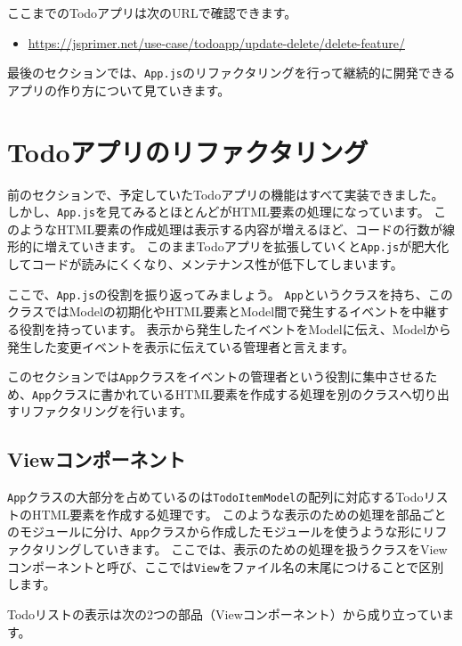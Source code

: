 ここまでのTodoアプリは次のURLで確認できます。

\begin{itemize}
\item
  \url{https://jsprimer.net/use-case/todoapp/update-delete/delete-feature/}
\end{itemize}

最後のセクションでは、\texttt{App.js}のリファクタリングを行って継続的に開発できるアプリの作り方について見ていきます。

\hypertarget{todo-app-refactoring}{%
\section{Todoアプリのリファクタリング}\label{todo-app-refactoring}}

前のセクションで、予定していたTodoアプリの機能はすべて実装できました。
しかし、\texttt{App.js}を見てみるとほとんどがHTML要素の処理になっています。
このようなHTML要素の作成処理は表示する内容が増えるほど、コードの行数が線形的に増えていきます。
このままTodoアプリを拡張していくと\texttt{App.js}が肥大化してコードが読みにくくなり、メンテナンス性が低下してしまいます。

ここで、\texttt{App.js}の役割を振り返ってみましょう。
\texttt{App}というクラスを持ち、このクラスではModelの初期化やHTML要素とModel間で発生するイベントを中継する役割を持っています。
表示から発生したイベントをModelに伝え、Modelから発生した変更イベントを表示に伝えている管理者と言えます。

このセクションでは\texttt{App}クラスをイベントの管理者という役割に集中させるため、\texttt{App}クラスに書かれているHTML要素を作成する処理を別のクラスへ切り出すリファクタリングを行います。

\hypertarget{component}{%
\subsection{Viewコンポーネント}\label{component}}

\texttt{App}クラスの大部分を占めているのは\texttt{TodoItemModel}の配列に対応するTodoリストのHTML要素を作成する処理です。
このような表示のための処理を部品ごとのモジュールに分け、\texttt{App}クラスから作成したモジュールを使うような形にリファクタリングしていきます。
ここでは、表示のための処理を扱うクラスをViewコンポーネントと呼び、ここでは\texttt{View}をファイル名の末尾につけることで区別します。

Todoリストの表示は次の2つの部品（Viewコンポーネント）から成り立っています。


